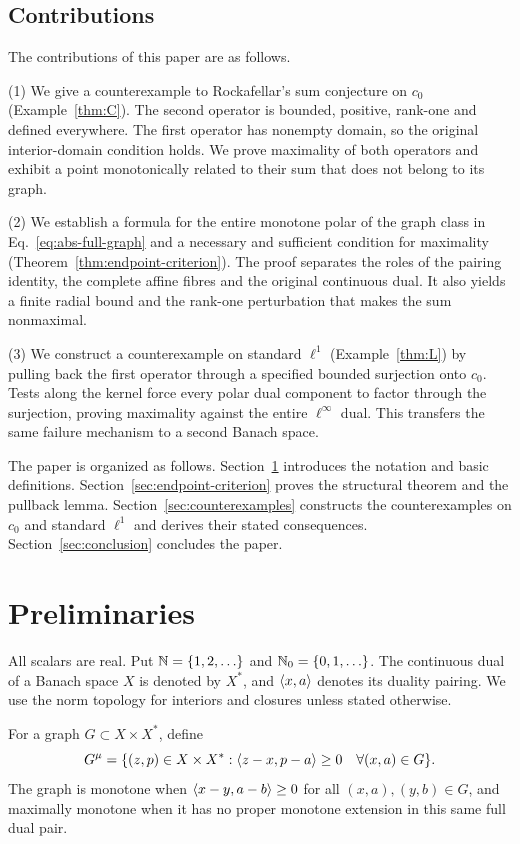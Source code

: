 \subsection{Contributions}
The contributions of this paper are as follows.

(1) We give a counterexample to Rockafellar's sum conjecture on $c_0$
(Example~\ref{thm:C}). The second operator is bounded, positive, rank-one
and defined everywhere. The first operator has nonempty domain, so the
original interior-domain condition holds. We prove maximality of both
operators and exhibit a point monotonically related to their sum that
does not belong to its graph.

(2) We establish a formula for the entire monotone polar of the graph
class in Eq.~\eqref{eq:abs-full-graph} and a necessary and sufficient
condition for maximality (Theorem~\ref{thm:endpoint-criterion}). The proof
separates the roles of the pairing identity, the complete affine fibres
and the original continuous dual. It also yields a finite radial bound
and the rank-one perturbation that makes the sum nonmaximal. 

(3) We construct a counterexample on standard $\ell^1$
(Example~\ref{thm:L}) by pulling back the first operator through a
specified bounded surjection onto $c_0$. Tests along the kernel force
every polar dual component to factor through the surjection, proving
maximality against the entire $\ell^\infty$ dual. This transfers the same
failure mechanism to a second Banach space. 

The paper is organized as follows. Section~\ref{sec:definitions}
introduces the notation and basic definitions.
Section~\ref{sec:endpoint-criterion} proves the structural theorem and
the pullback lemma. Section~\ref{sec:counterexamples} constructs the
counterexamples on $c_0$ and standard $\ell^1$ and derives their stated
consequences. Section~\ref{sec:conclusion} concludes the paper.


\section{Preliminaries}
\label{sec:definitions}
All scalars are real. Put $\mathbb N=\{1,2,\ldots\}$ and $\mathbb N_0=\{0,1,\ldots\}$.
The continuous dual of a Banach space $X$ is denoted by $X^*$, and
$\langle x,a\rangle$ denotes its duality pairing. We use the norm topology for
interiors and closures unless stated otherwise.

\begin{definition}
For a graph $G\subset X\times X^*$, define
\begin{equation}
G^\mu=\{(z,p)\in X\times X^*:
 \langle z-x,p-a\rangle\ge0\quad\forall(x,a)\in G\}.
\label{eq:D1}
\end{equation}
The graph is monotone when $\langle x-y,a-b\rangle\ge0$ for all
$(x,a),(y,b)\in G$,
and maximally monotone when it has no proper monotone extension in this same
full dual pair.
\end{definition}


